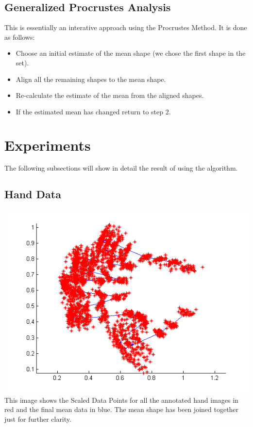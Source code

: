\documentclass[paper=a4, fontsize=11pt,twoside]{scrartcl}	%
\begin{document}
\subsection{Generalized Procrustes Analysis}
This is essentially an interative approach using the Procrustes Method.
It is done as follows:
\begin{itemize}
\item Choose an initial estimate of the mean shape (we chose the first shape in the set).
\item Align all the remaining shapes to the mean shape.
\item Re-calculate the estimate of the mean from the aligned shapes.
\item If the estimated mean has changed return to step 2.
\end{itemize}


\section{Experiments}
The following subsections will show in detail the result of using the algorithm.

\subsection{Hand Data}
\includegraphics{HandMeanwithData.png}
This image shows the Scaled Data Points for all the annotated hand images in red and the final mean data in blue. The mean shape has been joined together just for further clarity.
\end{document}
